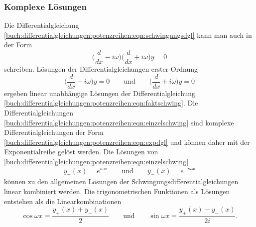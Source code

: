\subsubsection{Komplexe Lösungen}
Die Differentialgleichung 
\eqref{buch:differentialgleichungen:potenzreihen:eqn:schwingungsdgl}
kann man auch in der Form
\begin{equation}
\biggl(\frac{d}{dx}-i\omega\biggr)
\biggl(\frac{d}{dx}+i\omega\biggr)
y
=
0
\label{buch:differentialgleichungen:potenzreihen:eqn:faktschwing}
\end{equation}
schreiben.
Lösungen der Differentialgleichungen erster Ordnung
\begin{equation}
\biggl(\frac{d}{dx} - i \omega\biggr)y = 0
\qquad\text{und}\qquad
\biggl(\frac{d}{dx} + i \omega\biggr)y = 0
\label{buch:differentialgleichungen:potenzreihen:eqn:einzelschwing}
\end{equation}
ergeben linear unabhängige Lösungen der Differentialgleichung
\eqref{buch:differentialgleichungen:potenzreihen:eqn:faktschwing}.
Die Differentialgleichungen
\eqref{buch:differentialgleichungen:potenzreihen:eqn:einzelschwing}
sind komplexe Differentialgleichungen der Form
\eqref{buch:differentialgleichungen:potenzreihen:eqn:expdgl}
und können daher mit der Exponentialreihe gelöst werden.
Die Lösungen von 
\eqref{buch:differentialgleichungen:potenzreihen:eqn:einzelschwing}
\begin{equation}
y_+(x) = e^{i\omega x}
\qquad\text{und}\qquad
y_-(x) = e^{-i\omega x}
\end{equation}
können zu den allgemeinen Lösungen der Schwingungsdifferentialgleichungen
linear kombiniert werden.
Die trigonometrischen Funktionen als Lösungen entstehen als die
Linearkombinationen
\[
\cos \omega x
=
\frac{y_+(x)+y_-(x)}{2}
\qquad\text{und}\qquad
\sin \omega x
=
\frac{y_+(x)-y_-(x)}{2i}.
\]
